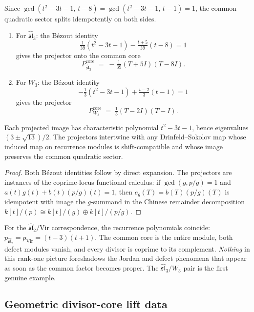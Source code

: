 \begin{proposition}
\label{prop:sl3-w3-projectors}
Since $\gcd(t^2-3t-1,\, t-8) = \gcd(t^2-3t-1,\, t-1) = 1$,
the common quadratic sector splits idempotently on both sides.
\begin{enumerate}[label=\textup{(\roman*)}]
\item For $\widehat{\mathfrak{sl}}_3$: the B\'{e}zout identity
 \[
 \tfrac{1}{39}(t^2-3t-1) - \tfrac{t+5}{39}(t-8) = 1
 \]
 gives the projector onto the common core
 \[
 P^{\mathrm{core}}_{\widehat{\mathfrak{sl}}_3}
 \;=\; -\tfrac{1}{39}(T+5I)(T-8I).
 \]
\item For $W_3$: the B\'{e}zout identity
 \[
 -\tfrac{1}{3}(t^2-3t-1) + \tfrac{t-2}{3}(t-1) = 1
 \]
 gives the projector
 \[
 P^{\mathrm{core}}_{W_3}
 \;=\; \tfrac{1}{3}(T-2I)(T-I).
 \]
\end{enumerate}
Each projected image has characteristic polynomial
$t^2-3t-1$, hence eigenvalues $(3 \pm \sqrt{13})/2$. The
projectors intertwine with any Drinfeld--Sokolov map whose induced
map on recurrence modules is shift-compatible and whose image
preserves the common quadratic sector.
\end{proposition}

\begin{proof}
Both B\'{e}zout identities follow by direct expansion.
The projectors are instances of the coprime-locus functional
calculus: if $\gcd(g,p/g)=1$ and $a(t)g(t)+b(t)(p/g)(t)=1$,
then $e_g(T)=b(T)(p/g)(T)$ is idempotent with image the
$g$-summand in the Chinese remainder decomposition
$k[t]/(p) \cong k[t]/(g) \oplus k[t]/(p/g)$.
\end{proof}

\begin{remark}
\label{rem:rank-one-deceptive}
For the $\widehat{\mathfrak{sl}}_2/\mathrm{Vir}$
correspondence, the recurrence polynomials coincide:
$p_{\widehat{\mathfrak{sl}}_2} = p_{\mathrm{Vir}}
 = (t-3)(t+1)$.
The common core is the entire module, both defect modules
vanish, and every divisor is coprime to its complement.
\emph{Nothing} in this rank-one picture foreshadows
the Jordan and defect phenomena that appear as soon as
the common factor becomes proper. The
$\widehat{\mathfrak{sl}}_3/W_3$ pair is the first genuine
example.
\end{remark}

\subsection{Geometric divisor-core lift data}
\label{subsec:casimir-frontier}

